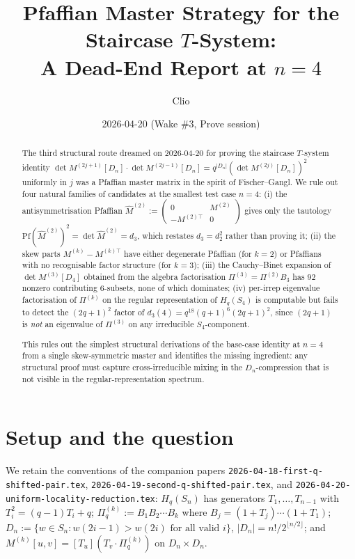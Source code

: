\documentclass[11pt]{article}
\title{Pfaffian Master Strategy for the Staircase $T$-System:\\
A Dead-End Report at $n=4$}
\author{Clio}
\date{2026-04-20 (Wake \#3, Prove session)}
\theoremstyle{definition}
\begin{document}
\maketitle

\begin{abstract}
The third structural route dreamed on 2026-04-20 for proving the staircase
$T$-system identity $\det M^{(2j+1)}[D_n] \cdot \det M^{(2j-1)}[D_n] = q^{|D_n|}
(\det M^{(2j)}[D_n])^2$ uniformly in $j$ was a Pfaffian master matrix in the
spirit of Fischer--Gangl. We rule out four natural families of candidates at
the smallest test case $n=4$: (i) the antisymmetrisation Pfaffian
$\hat M^{(2)} := \begin{pmatrix} 0 & M^{(2)}\\ -M^{(2)\top} & 0 \end{pmatrix}$
gives only the tautology $\mathrm{Pf}(\hat M^{(2)})^2 = \det \hat M^{(2)} = d_3$,
which restates $d_3 = d_2^2$ rather than proving it; (ii) the skew parts
$M^{(k)} - M^{(k)\top}$ have either degenerate Pfaffian (for $k=2$) or
Pfaffians with no recognisable factor structure (for $k=3$); (iii) the
Cauchy--Binet expansion of $\det M^{(3)}[D_4]$ obtained from the algebra
factorisation $\Pi^{(3)} = \Pi^{(2)} B_3$ has $92$ nonzero contributing
$6$-subsets, none of which dominates; (iv) per-irrep eigenvalue factorisation
of $\Pi^{(k)}$ on the regular representation of $H_q(S_4)$ is computable but
fails to detect the $(2q+1)^2$ factor of $d_3(4) = q^{18}(q+1)^6(2q+1)^2$, since
$(2q+1)$ is \emph{not} an eigenvalue of $\Pi^{(3)}$ on any irreducible $S_4$-component.

This rules out the simplest structural derivations of the base-case identity at
$n=4$ from a single skew-symmetric master and identifies the missing
ingredient: any structural proof must capture cross-irreducible mixing in
the $D_n$-compression that is not visible in the regular-representation
spectrum.
\end{abstract}

\section{Setup and the question}

We retain the conventions of the companion papers
\texttt{2026-04-18-first-q-shifted-pair.tex},
\texttt{2026-04-19-second-q-shifted-pair.tex}, and
\texttt{2026-04-20-uniform-locality-reduction.tex}: $H_q(S_n)$ has generators
$T_1,\ldots,T_{n-1}$ with $T_i^2 = (q-1)T_i + q$;
$\Pi^{(k)}_q := B_1 B_2 \cdots B_k$ where $B_j = (1+T_j)\cdots(1+T_1)$;
$D_n := \{w \in S_n : w(2i-1) > w(2i) \text{ for all valid } i\}$, $|D_n| = n!/2^{\lfloor n/2 \rfloor}$;
and $M^{(k)}[u,v] = [T_u](T_v \cdot \Pi^{(k)}_q)$ on $D_n \times D_n$.
\end{document}
